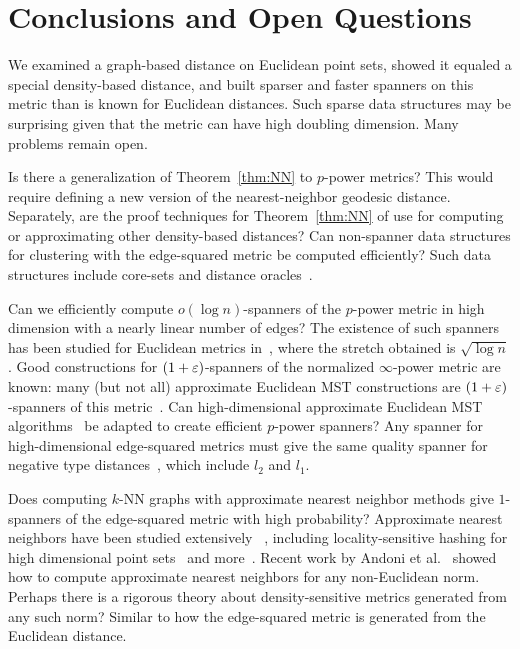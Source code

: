 \section{Conclusions and Open Questions}\label{sec:conclusions}


We examined a
graph-based distance on Euclidean point sets, showed it equaled a
special density-based distance, and built sparser and faster
spanners
on this metric than is known for Euclidean distances.
Such sparse data structures may be
surprising given that the metric can have high doubling dimension.
Many problems remain open.

Is there a generalization of Theorem~\ref{thm:NN} to $p$-power
metrics? This would
require defining a new version of the nearest-neighbor geodesic distance. Separately, are the
proof techniques for Theorem~\ref{thm:NN} of use for computing
or approximating other density-based distances?
Can non-spanner data
structures for clustering with the edge-squared metric be
computed efficiently?
Such data structures include core-sets and
distance oracles~\cite{Badoiu02, Sohler18, Thorup05}.

Can we efficiently compute $o(\log n)$-spanners of the $p$-power metric in
high dimension with a
nearly linear number of edges?
The existence of such spanners has been studied for Euclidean metrics in~\cite{HarPeled13}, where the stretch
obtained is $\sqrt{\log n}$.
Good constructions for $(1+\varepsilon)$-spanners of the
normalized $\infty$-power metric are known: many (but not all) approximate Euclidean MST constructions are
$(1+\varepsilon)$-spanners of this metric~\cite{Callahan1995, Yaro2017}.
Can high-dimensional
approximate Euclidean MST algorithms~\cite{Alman2016, Yaro2017, Andoni2014}
be adapted to
create efficient $p$-power spanners?
Any spanner for high-dimensional
edge-squared metrics must
give the same quality spanner for negative type
distances~\cite{Schoenberg1937, Deza1997},
which include $l_2$ and $l_1$.

Does computing $k$-NN graphs with approximate nearest neighbor methods give $1$-spanners of the
edge-squared metric with high probability?
Approximate nearest neighbors have been studied extensively
~\cite{kNNsurvey, Chen11, Dong11}, including locality-sensitive
hashing for high dimensional point sets~\cite{LSH} and
more~\cite{Laarhoven2018}.
Recent work by Andoni et al.~\cite{Andoni2018} showed how to compute
approximate nearest neighbors for any non-Euclidean norm.  Perhaps there
is a rigorous theory about density-sensitive metrics generated from any such
norm? Similar to
how the edge-squared metric is generated from the Euclidean distance.

